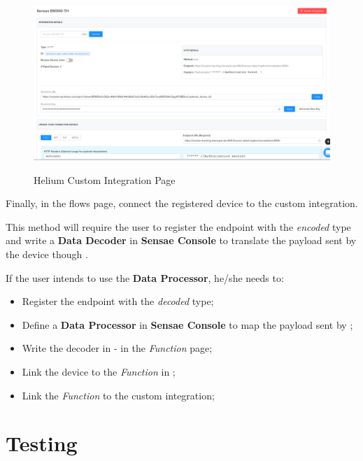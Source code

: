 \begin{figure}[H]
    \centering
    \resizebox{\columnwidth}{!}
    {
       \includegraphics{assets/figures/sensor/integration.png}
    }
    \caption[Helium Custom Integration Page]{Helium Custom Integration Page}
    \label{fig:implementation:description:sensor:integration}
\end{figure}

Finally, in the  flows page, connect the registered device to the custom integration.

This method will require the user to register the endpoint with the \textit{encoded} type and write a \textbf{Data Decoder} in \textbf{Sensae Console} to translate the payload sent by the device though .

If the user intends to use the \textbf{Data Processor}, he/she needs to:

\begin{itemize}
    \item Register the endpoint with the \textit{decoded} type;
    \item Define a \textbf{Data Processor} in \textbf{Sensae Console} to map the payload sent by ;
    \item Write the decoder in  - in the \textit{Function} page;
    \item Link the device to the \textit{Function} in ;
    \item Link the \textit{Function} to the custom integration;
\end{itemize}

\section{Testing}
\label{sec:implementation:testing}

